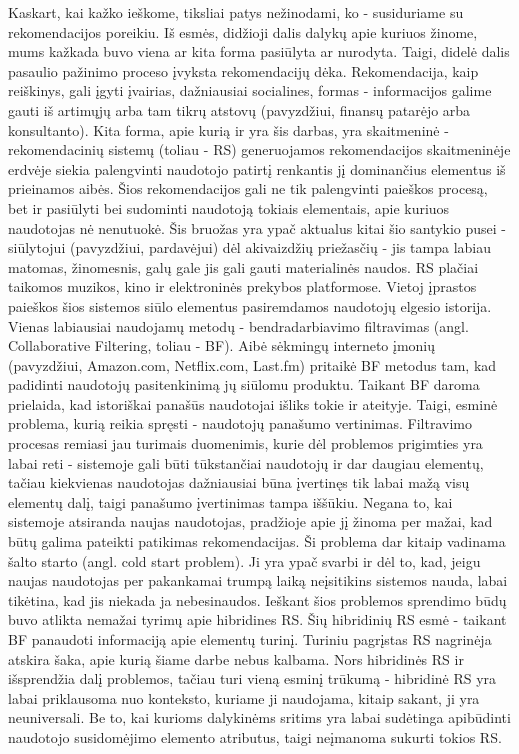 \documentclass{VUMIFInfMagistrinis}
\begin{document}
\linespread{1.5}
\selectfont
\indent
Kaskart, kai kažko ieškome, tiksliai patys nežinodami, ko - susiduriame su rekomendacijos poreikiu. Iš esmės, didžioji dalis dalykų apie kuriuos žinome, mums kažkada buvo viena ar kita forma pasiūlyta ar nurodyta. Taigi, didelė dalis pasaulio pažinimo proceso įvyksta rekomendacijų dėka. Rekomendacija, kaip reiškinys, gali įgyti įvairias, dažniausiai socialines, formas - informacijos galime gauti iš artimųjų arba tam tikrų atstovų (pavyzdžiui, finansų patarėjo arba konsultanto). Kita forma, apie kurią ir yra šis darbas, yra skaitmeninė - rekomendacinių sistemų (toliau - RS) generuojamos rekomendacijos skaitmeninėje erdvėje siekia palengvinti naudotojo patirtį renkantis jį dominančius elementus iš prieinamos aibės. Šios rekomendacijos gali ne tik palengvinti paieškos procesą, bet ir pasiūlyti bei sudominti naudotoją tokiais elementais, apie kuriuos naudotojas nė nenutuokė. Šis bruožas yra ypač aktualus kitai šio santykio pusei - siūlytojui (pavyzdžiui, pardavėjui) dėl akivaizdžių priežasčių - jis tampa labiau matomas, žinomesnis, galų gale jis gali gauti materialinės naudos.
\newline
\indent
RS plačiai taikomos muzikos, kino ir elektroninės prekybos platformose. Vietoj įprastos paieškos šios sistemos siūlo elementus pasiremdamos naudotojų elgesio istorija. Vienas labiausiai naudojamų metodų - bendradarbiavimo filtravimas (angl. Collaborative Filtering, toliau - BF). Aibė sėkmingų interneto įmonių (pavyzdžiui, Amazon.com, Netflix.com, Last.fm) pritaikė BF metodus tam, kad padidinti naudotojų pasitenkinimą jų siūlomu produktu. Taikant BF daroma prielaida, kad istoriškai panašūs naudotojai išliks tokie ir ateityje. Taigi, esminė problema, kurią reikia spręsti - naudotojų panašumo vertinimas. Filtravimo procesas remiasi jau turimais duomenimis, kurie dėl problemos prigimties yra labai reti - sistemoje gali būti tūkstančiai naudotojų ir dar daugiau elementų, tačiau kiekvienas naudotojas dažniausiai būna įvertinęs tik labai mažą visų elementų dalį, taigi panašumo įvertinimas tampa iššūkiu. Negana to, kai sistemoje atsiranda naujas naudotojas, pradžioje apie jį žinoma per mažai, kad būtų galima pateikti patikimas rekomendacijas. Ši problema dar kitaip vadinama šalto starto (angl. cold start problem). Ji yra ypač svarbi ir dėl to, kad, jeigu naujas naudotojas per pakankamai trumpą laiką neįsitikins sistemos nauda, labai tikėtina, kad jis niekada ja nebesinaudos.
\newline
\indent
Ieškant šios problemos sprendimo būdų buvo atlikta nemažai tyrimų apie hibridines RS. Šių hibridinių RS esmė - taikant BF panaudoti informaciją apie elementų turinį. Turiniu pagrįstas RS nagrinėja atskira šaka, apie kurią šiame darbe nebus kalbama. Nors hibridinės RS ir išsprendžia dalį problemos, tačiau turi vieną esminį trūkumą - hibridinė RS yra labai priklausoma nuo konteksto, kuriame ji naudojama, kitaip sakant, ji yra neuniversali. Be to, kai kurioms dalykinėms sritims yra labai sudėtinga apibūdinti naudotojo susidomėjimo elemento atributus, taigi neįmanoma sukurti tokios RS.
\end{document}
